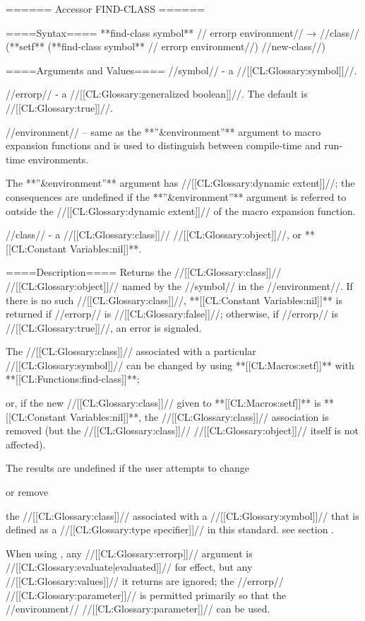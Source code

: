 ====== Accessor FIND-CLASS ======

====Syntax====
**find-class {symbol** //\opt} errorp environment// → //class// 
(**setf** (**find-class {symbol** //\opt} errorp environment//) //new-class//)

====Arguments and Values====
//symbol// - a //[[CL:Glossary:symbol]]//.

//errorp// - a //[[CL:Glossary:generalized boolean]]//. The default is //[[CL:Glossary:true]]//.

//environment// -- same as the **''&environment''** argument to macro expansion functions and is used to distinguish between compile-time and run-time environments.

The **''&environment''** argument has //[[CL:Glossary:dynamic extent]]//; the consequences are undefined if the **''&environment''** argument is referred to outside the //[[CL:Glossary:dynamic extent]]// of the macro expansion function.

//class// - a //[[CL:Glossary:class]]// //[[CL:Glossary:object]]//, or **[[CL:Constant Variables:nil]]**.

====Description====
Returns the //[[CL:Glossary:class]]// //[[CL:Glossary:object]]// named by the //symbol// in the //environment//. If there is no such //[[CL:Glossary:class]]//, **[[CL:Constant Variables:nil]]** is returned if //errorp// is //[[CL:Glossary:false]]//; otherwise, if //errorp// is //[[CL:Glossary:true]]//, an error is signaled.

The //[[CL:Glossary:class]]// associated with a particular //[[CL:Glossary:symbol]]// can be changed by using **[[CL:Macros:setf]]** with **[[CL:Functions:find-class]]**;

or, if the new //[[CL:Glossary:class]]// given to **[[CL:Macros:setf]]** is **[[CL:Constant Variables:nil]]**, the //[[CL:Glossary:class]]// association is removed (but the //[[CL:Glossary:class]]// //[[CL:Glossary:object]]// itself is not affected).

The results are undefined if the user attempts to change

or remove

the //[[CL:Glossary:class]]// associated with a //[[CL:Glossary:symbol]]// that is defined as a //[[CL:Glossary:type specifier]]// in this standard. see section {\secref\IntegratingTypesAndClasses}.

When using , any //[[CL:Glossary:errorp]]// argument is //[[CL:Glossary:evaluate|evaluated]]// for effect, but any //[[CL:Glossary:values]]// it returns are ignored; the //errorp// //[[CL:Glossary:parameter]]// is permitted primarily so that the //environment// //[[CL:Glossary:parameter]]// can be used.

